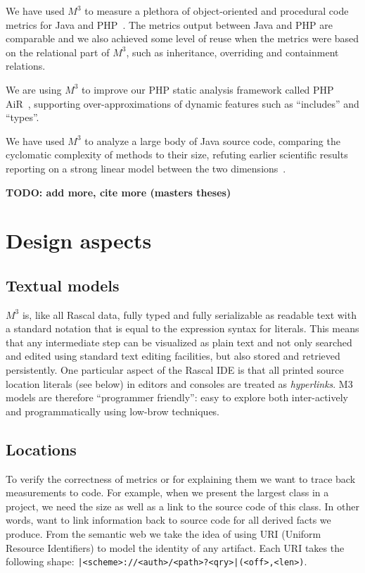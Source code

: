 \documentclass[conference]{IEEEtran}
\newcommand{\loc}[1]{\small{\texttt{#1}}\xspace}
\newcommand{\mthree}{\ensuremath{M^3}\xspace}
\begin{document}
We have used \mthree to measure a plethora of object-oriented and procedural code metrics for Java and PHP~\cite{mood,ck}. The metrics output between Java and PHP are comparable and we also achieved some level of reuse when the metrics were based on the relational part of \mthree, such as inheritance, overriding and containment relations.

We are using \mthree to improve our PHP static analysis framework called PHP AiR~\cite{phpair}, supporting over-approximations of dynamic features such as ``includes'' and ``types''. 

We have used \mthree to analyze a large body of Java source code, comparing the cyclomatic complexity of methods to their size, refuting earlier scientific results reporting on a strong linear model between the two dimensions~\cite{davy}.

\textbf{TODO: add more, cite more (masters theses)}

\section{Design aspects}

\subsection{Textual models}

\mthree is, like all Rascal data, fully typed and fully serializable as readable
text with a standard notation that is equal to the expression syntax for
literals. This means that any intermediate step can be visualized as plain
text and not only searched and edited using standard text editing facilities,
but also stored and retrieved persistently. One particular aspect of the
Rascal IDE is that all printed source location literals (see below) in editors
and consoles are treated as \emph{hyperlinks}. M3 models are therefore
``programmer friendly'': easy to explore both inter-actively and
programmatically using low-brow techniques.

\subsection{Locations} 

To verify the correctness of metrics or for explaining them we want to trace
back measurements to code. For example, when we present the largest class in a
project, we need the size as well as a link to the source code of this class.
In other words, want to link information back to source code for all derived
facts we produce. From the semantic web we take the idea of using URI (Uniform
Resource Identifiers) to model the identity of any artifact. Each URI takes
the following shape: \loc{|<scheme>://<auth>/<path>?<qry>|(<off>,<len>)}.
\end{document}

